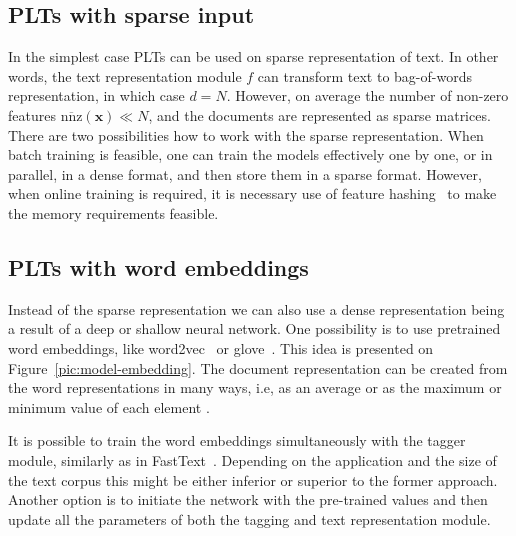 \documentclass{article}
\renewcommand{\vec}[1]{\boldsymbol{#1}}
\newcommand{\bx}{\vec{x}}
\newcommand{\sectionBefore}{-0pt}
\newcommand{\sectionAfter}{-0pt}
\begin{document}
\subsection{PLTs with sparse input}
\label{sec:sparse_input}
\vspace{\sectionAfter}

In the simplest case PLTs can be used on sparse representation of text. In other words, the text representation module $f$ can transform text to bag-of-words representation, in which case $d=N$. However, on average the number of non-zero features $\overline{\mathrm{nnz}}(\bx) \ll N$, and the documents are represented as sparse matrices. %
There are two possibilities how to work with the sparse representation. When batch training is feasible, one can train the models effectively one by one, or in parallel, in a dense format, and then store them in a sparse format. However, when online training is required, it is necessary use of feature hashing~\citep{Weinberger_et_al_2009} to make the memory requirements feasible. 

\vspace{\sectionBefore}
\subsection{PLTs with word embeddings}
\label{sec:sparse_input}
\vspace{\sectionAfter}

Instead of the sparse representation we can also use a dense representation being a result of a deep or shallow neural network.
One possibility is to use pretrained word embeddings, like word2vec~\citep{word2vec} or glove~\citep{glove}. This idea is presented on Figure~\ref{pic:model-embedding}. The document representation can be created from the word representations in many ways, i.e, as an average \cite{!} or as the maximum or minimum value of each element \cite{!}.

It is possible to train the word embeddings simultaneously with the tagger module, similarly as in FastText~\citep{}. Depending on the application and the size of the text corpus this might be either inferior or superior to the former approach. Another option is to initiate the network with the pre-trained values and then update all the parameters of both the tagging and text representation module. 
\end{document}
